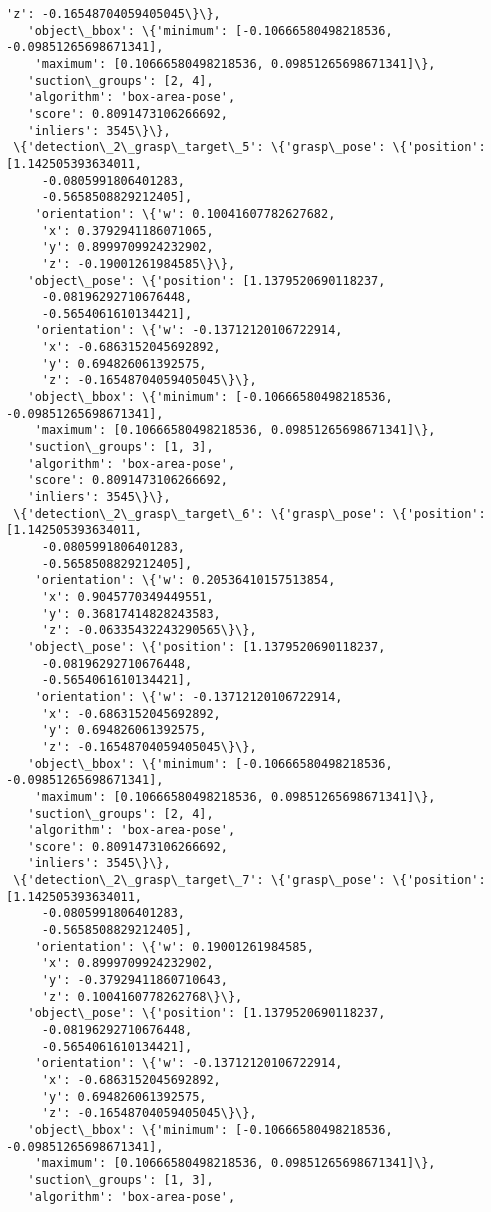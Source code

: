 \documentclass[11pt]{article}
\begin{document}
\begin{tcolorbox}[breakable, size=fbox, boxrule=.5pt, pad at break*=1mm, opacityfill=0]
\begin{Verbatim}[commandchars=\\\{\}]
     'z': -0.16548704059405045\}\},
   'object\_bbox': \{'minimum': [-0.10666580498218536, -0.09851265698671341],
    'maximum': [0.10666580498218536, 0.09851265698671341]\},
   'suction\_groups': [2, 4],
   'algorithm': 'box-area-pose',
   'score': 0.8091473106266692,
   'inliers': 3545\}\},
 \{'detection\_2\_grasp\_target\_5': \{'grasp\_pose': \{'position': [1.142505393634011,
     -0.0805991806401283,
     -0.5658508829212405],
    'orientation': \{'w': 0.10041607782627682,
     'x': 0.3792941186071065,
     'y': 0.8999709924232902,
     'z': -0.19001261984585\}\},
   'object\_pose': \{'position': [1.1379520690118237,
     -0.08196292710676448,
     -0.5654061610134421],
    'orientation': \{'w': -0.13712120106722914,
     'x': -0.6863152045692892,
     'y': 0.694826061392575,
     'z': -0.16548704059405045\}\},
   'object\_bbox': \{'minimum': [-0.10666580498218536, -0.09851265698671341],
    'maximum': [0.10666580498218536, 0.09851265698671341]\},
   'suction\_groups': [1, 3],
   'algorithm': 'box-area-pose',
   'score': 0.8091473106266692,
   'inliers': 3545\}\},
 \{'detection\_2\_grasp\_target\_6': \{'grasp\_pose': \{'position': [1.142505393634011,
     -0.0805991806401283,
     -0.5658508829212405],
    'orientation': \{'w': 0.20536410157513854,
     'x': 0.9045770349449551,
     'y': 0.36817414828243583,
     'z': -0.06335432243290565\}\},
   'object\_pose': \{'position': [1.1379520690118237,
     -0.08196292710676448,
     -0.5654061610134421],
    'orientation': \{'w': -0.13712120106722914,
     'x': -0.6863152045692892,
     'y': 0.694826061392575,
     'z': -0.16548704059405045\}\},
   'object\_bbox': \{'minimum': [-0.10666580498218536, -0.09851265698671341],
    'maximum': [0.10666580498218536, 0.09851265698671341]\},
   'suction\_groups': [2, 4],
   'algorithm': 'box-area-pose',
   'score': 0.8091473106266692,
   'inliers': 3545\}\},
 \{'detection\_2\_grasp\_target\_7': \{'grasp\_pose': \{'position': [1.142505393634011,
     -0.0805991806401283,
     -0.5658508829212405],
    'orientation': \{'w': 0.19001261984585,
     'x': 0.8999709924232902,
     'y': -0.37929411860710643,
     'z': 0.1004160778262768\}\},
   'object\_pose': \{'position': [1.1379520690118237,
     -0.08196292710676448,
     -0.5654061610134421],
    'orientation': \{'w': -0.13712120106722914,
     'x': -0.6863152045692892,
     'y': 0.694826061392575,
     'z': -0.16548704059405045\}\},
   'object\_bbox': \{'minimum': [-0.10666580498218536, -0.09851265698671341],
    'maximum': [0.10666580498218536, 0.09851265698671341]\},
   'suction\_groups': [1, 3],
   'algorithm': 'box-area-pose',

\end{Verbatim}
\end{tcolorbox}
\end{document}
